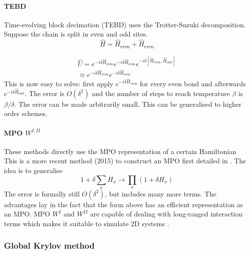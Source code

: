 \paragraph{\Gls{TEBD}}
Time-evolving block decimation (\Gls{TEBD})  uses the Trotter-Suzuki decomposition. Suppose the chain is split in even and odd sites.
\begin{equation}
    \hat{H} = \hat{H}_{\text{even}}+\hat{H}_{\text{even}}
\end{equation}

\begin{equation}\label{trotter_exp}
    \begin{split}
        \hat{U} = e^{-i \delta \hat{H}_{\text{even}}}  e^{-i \delta \hat{H}_{\text{even}} }e^{-i \delta \left[ \hat{H}_{\text{even}}, \hat{H}_{\text{odd}} \right] }\\
        \approx e^{-i \delta \hat{H}_{\text{even}}}  e^{-i \delta \hat{H}_{\text{even}} }
    \end{split}
\end{equation}
This is now easy to solve: first apply $e^{-i \delta \hat{H}_{\text{even}}}$ for every even bond and afterwards  $e^{-i \delta \hat{H}_{\text{odd}}}$. The error is $O(\delta^2)$ and the number of steps to reach temperature $\beta$ is $\beta / \delta$. The error can be made arbitrarily small. This can be generalised to higher order schemes.

\paragraph{ MPO $W^{I,II}$}
These methods directly use the \Gls{MPO} representation of a certain Hamiltonian
This is a more recent method (2015) to construct an \Gls{MPO} first detailed in \cite{Zaletel2015}. The idea is to generalise
\begin{equation}
    1+ \delta \sum_x H_x \rightarrow \prod_x (1+  \delta H_x)
\end{equation}
The error is formally still $O(\delta^2)$, but includes many more terms. The advantages lay in the fact that the form above has an efficient representation as an \Gls{MPO}. \Gls{MPO} $W^I$ and $W^{II}$ are capable of dealing with long-ranged interaction terms which makes it suitable to simulate 2D systems \cite{Paeckel2019}.

\subsubsection{Global Krylov method}

